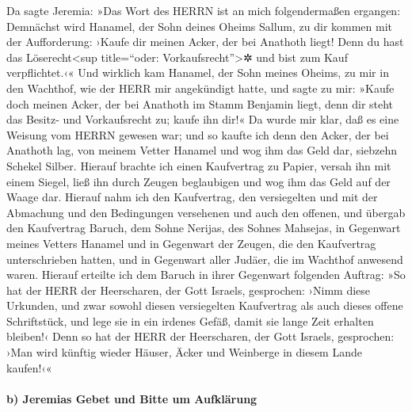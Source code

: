 Da sagte Jeremia: »Das Wort des HERRN ist an mich
folgendermaßen ergangen: Demnächst wird Hanamel, der Sohn
deines Oheims Sallum, zu dir kommen mit der Aufforderung: ›Kaufe dir
meinen Acker, der bei Anathoth liegt! Denn du hast das
Löserecht\textless sup title=``oder: Vorkaufsrecht''\textgreater✲ und
bist zum Kauf verpflichtet.‹« Und wirklich kam Hanamel,
der Sohn meines Oheims, zu mir in den Wachthof, wie der HERR mir
angekündigt hatte, und sagte zu mir: »Kaufe doch meinen Acker, der bei
Anathoth im Stamm Benjamin liegt, denn dir steht das Besitz- und
Vorkaufsrecht zu; kaufe ihn dir!« Da wurde mir klar, daß es eine Weisung
vom HERRN gewesen war; und so kaufte ich denn den Acker,
der bei Anathoth lag, von meinem Vetter Hanamel und wog ihm das Geld
dar, siebzehn Schekel Silber. Hierauf brachte ich einen
Kaufvertrag zu Papier, versah ihn mit einem Siegel, ließ ihn durch
Zeugen beglaubigen und wog ihm das Geld auf der Waage dar.
Hierauf nahm ich den Kaufvertrag, den versiegelten und
mit der Abmachung und den Bedingungen versehenen und auch den offenen,
und übergab den Kaufvertrag Baruch, dem Sohne Nerijas,
des Sohnes Mahsejas, in Gegenwart meines Vetters Hanamel und in
Gegenwart der Zeugen, die den Kaufvertrag unterschrieben hatten, und in
Gegenwart aller Judäer, die im Wachthof anwesend waren.
Hierauf erteilte ich dem Baruch in ihrer Gegenwart
folgenden Auftrag: »So hat der HERR der Heerscharen, der
Gott Israels, gesprochen: ›Nimm diese Urkunden, und zwar sowohl diesen
versiegelten Kaufvertrag als auch dieses offene Schriftstück, und lege
sie in ein irdenes Gefäß, damit sie lange Zeit erhalten bleiben!‹
Denn so hat der HERR der Heerscharen, der Gott Israels,
gesprochen: ›Man wird künftig wieder Häuser, Äcker und Weinberge in
diesem Lande kaufen!‹«

\hypertarget{b-jeremias-gebet-und-bitte-um-aufkluxe4rung}{%
\paragraph{b) Jeremias Gebet und Bitte um
Aufklärung}\label{b-jeremias-gebet-und-bitte-um-aufkluxe4rung}}

